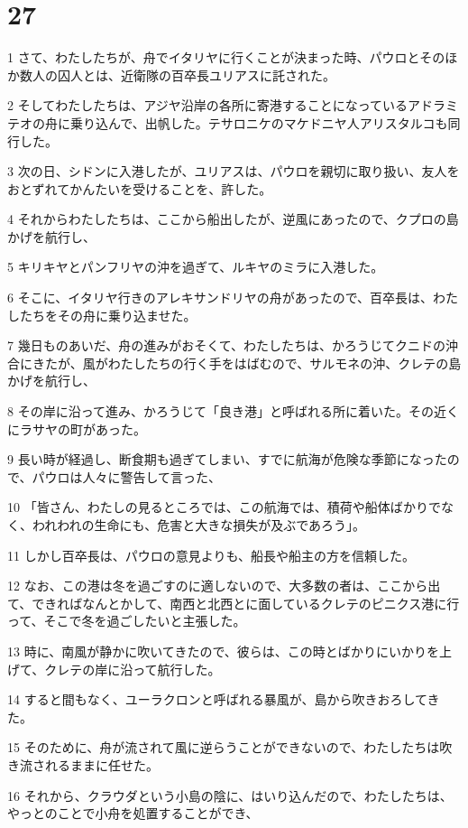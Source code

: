 \chapter{27}

\par 1 さて、わたしたちが、舟でイタリヤに行くことが決まった時、パウロとそのほか数人の囚人とは、近衛隊の百卒長ユリアスに託された。
\par 2 そしてわたしたちは、アジヤ沿岸の各所に寄港することになっているアドラミテオの舟に乗り込んで、出帆した。テサロニケのマケドニヤ人アリスタルコも同行した。
\par 3 次の日、シドンに入港したが、ユリアスは、パウロを親切に取り扱い、友人をおとずれてかんたいを受けることを、許した。
\par 4 それからわたしたちは、ここから船出したが、逆風にあったので、クプロの島かげを航行し、
\par 5 キリキヤとパンフリヤの沖を過ぎて、ルキヤのミラに入港した。
\par 6 そこに、イタリヤ行きのアレキサンドリヤの舟があったので、百卒長は、わたしたちをその舟に乗り込ませた。
\par 7 幾日ものあいだ、舟の進みがおそくて、わたしたちは、かろうじてクニドの沖合にきたが、風がわたしたちの行く手をはばむので、サルモネの沖、クレテの島かげを航行し、
\par 8 その岸に沿って進み、かろうじて「良き港」と呼ばれる所に着いた。その近くにラサヤの町があった。
\par 9 長い時が経過し、断食期も過ぎてしまい、すでに航海が危険な季節になったので、パウロは人々に警告して言った、
\par 10 「皆さん、わたしの見るところでは、この航海では、積荷や船体ばかりでなく、われわれの生命にも、危害と大きな損失が及ぶであろう」。
\par 11 しかし百卒長は、パウロの意見よりも、船長や船主の方を信頼した。
\par 12 なお、この港は冬を過ごすのに適しないので、大多数の者は、ここから出て、できればなんとかして、南西と北西とに面しているクレテのピニクス港に行って、そこで冬を過ごしたいと主張した。
\par 13 時に、南風が静かに吹いてきたので、彼らは、この時とばかりにいかりを上げて、クレテの岸に沿って航行した。
\par 14 すると間もなく、ユーラクロンと呼ばれる暴風が、島から吹きおろしてきた。
\par 15 そのために、舟が流されて風に逆らうことができないので、わたしたちは吹き流されるままに任せた。
\par 16 それから、クラウダという小島の陰に、はいり込んだので、わたしたちは、やっとのことで小舟を処置することができ、
